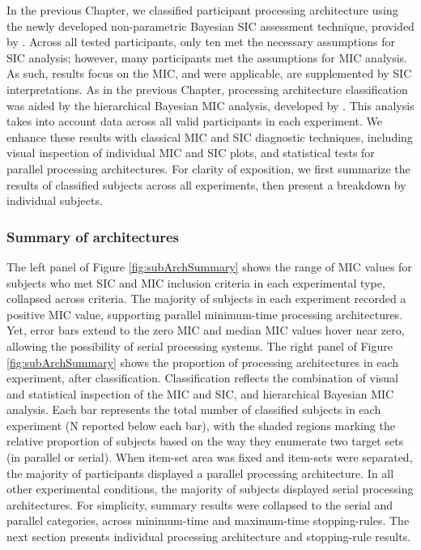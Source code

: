 In the previous Chapter, we classified participant processing architecture using the newly developed non-parametric Bayesian SIC assessment technique, provided by . Across all tested participants, only ten met the necessary assumptions for SIC analysis; however, many participants met the assumptions for MIC analysis. As such, results focus on %
the MIC, and were applicable, are supplemented by SIC interpretations. As in the previous Chapter, processing architecture classification was aided by the hierarchical Bayesian MIC analysis, developed by . This analysis takes into account data across all valid participants in each experiment. We enhance these results with classical MIC and SIC diagnostic techniques, including visual inspection of individual MIC and SIC plots, and statistical tests for parallel processing architectures. For clarity of exposition, we first summarize the results of classified subjects across all experiments, then present a breakdown by individual subjects. 

\subsubsection{Summary of architectures}
The left panel of Figure \ref{fig:subArchSummary} shows the range of MIC values for subjects who met SIC and MIC inclusion criteria in each experimental type, collapsed across criteria. The majority of subjects in each experiment recorded a positive MIC value, supporting parallel minimum-time processing architectures. Yet, error bars extend to the zero MIC and median MIC values hover near zero, allowing the possibility of serial processing systems. The right panel of Figure \ref{fig:subArchSummary} shows the proportion of processing architectures in each experiment, after classification. Classification reflects the combination of visual and statistical inspection of the MIC and SIC, and hierarchical Bayesian MIC analysis. Each bar represents the total number of classified subjects in each experiment (N reported below each bar), with the shaded regions marking the relative proportion of subjects based on the way they enumerate two target sets (in parallel or serial). When item-set area was fixed and item-sets were separated, the majority of participants displayed a parallel processing architecture. In all other experimental conditions, the majority of subjects displayed serial processing architectures. For simplicity, summary results were collapsed to the serial and parallel categories, across minimum-time and maximum-time stopping-rules. The next section presents individual processing architecture and stopping-rule results. 

